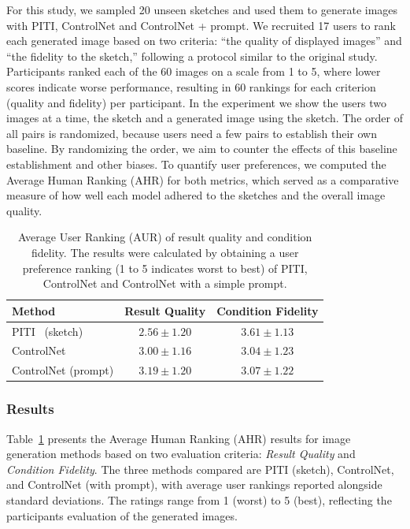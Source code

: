 For this study, we sampled 20 unseen sketches and used them to generate images with PITI, ControlNet and ControlNet + prompt. We recruited 17 users to rank each generated image based on two criteria: “the quality of displayed images” and “the fidelity to the sketch,” following a protocol similar to the original study. Participants ranked each of the 60 images on a scale from 1 to 5, where lower scores indicate worse performance, resulting in 60 rankings for each criterion (quality and fidelity) per participant. In the experiment we show the users two images at a time, the sketch and a generated image using the sketch. The order of all pairs is randomized, because users need a few pairs to establish their own baseline. By randomizing the order, we aim to counter the effects of this baseline establishment and other biases. To quantify user preferences, we computed the Average Human Ranking (AHR) for both metrics, which served as a comparative measure of how well each model adhered to the sketches and the overall image quality.
\begin{table}[hbp]
    \centering
    \def\arraystretch{1.1}
    \begin{tabular}{lcc}
        \toprule
        \textbf{Method}     & \textbf{Result Quality} & \textbf{Condition Fidelity}  \\
        \midrule
        PITI~\cite{wang2022pretrainingneedimagetoimagetranslation} (sketch)            & $2.56 \pm 1.20$         & $3.61 \pm 1.13$ \\
        ControlNet          & $3.00 \pm 1.16$         & $3.04 \pm 1.23$ \\
        ControlNet (prompt) & $3.19 \pm 1.20$         & $3.07 \pm 1.22$ \\
        \bottomrule
    \end{tabular}
    \caption{Average User Ranking (AUR) of result quality and
    condition fidelity. The results were calculated by obtaining a user preference ranking (1 to 5 indicates worst to best) of PITI, ControlNet and ControlNet with a simple prompt.}
    \label{tab:controlnet:experiment}
\end{table}


\noindent
\subsubsection{Results}
Table~\ref{tab:controlnet:experiment} presents the Average Human Ranking (AHR) results for image generation methods based on two evaluation criteria: \textit{Result Quality} and \textit{Condition Fidelity}. The three methods compared are PITI (sketch), ControlNet, and ControlNet (with prompt), with average user rankings reported alongside standard deviations. The ratings range from 1 (worst) to 5 (best), reflecting the participants evaluation of the generated images.

